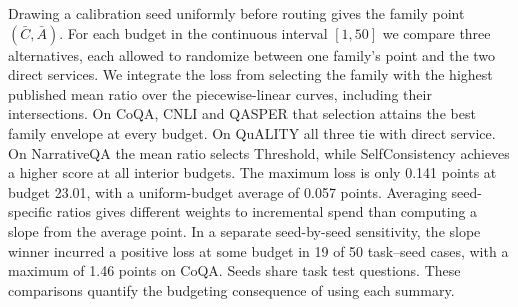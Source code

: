 Drawing a calibration seed uniformly before routing gives the family point $(\bar C,\bar A)$. For each budget in the continuous interval $[1,50]$ we compare three alternatives, each allowed to randomize between one family's point and the two direct services. We integrate the loss from selecting the family with the highest published mean ratio over the piecewise-linear curves, including their intersections. On CoQA, CNLI and QASPER that selection attains the best family envelope at every budget. On QuALITY all three tie with direct service. On NarrativeQA the mean ratio selects Threshold, while SelfConsistency achieves a higher score at all interior budgets. The maximum loss is only 0.141 points at budget 23.01, with a uniform-budget average of 0.057 points. Averaging seed-specific ratios gives different weights to incremental spend than computing a slope from the average point. In a separate seed-by-seed sensitivity, the slope winner incurred a positive loss at some budget in 19 of 50 task--seed cases, with a maximum of 1.46 points on CoQA. Seeds share task test questions. These comparisons quantify the budgeting consequence of using each summary.
